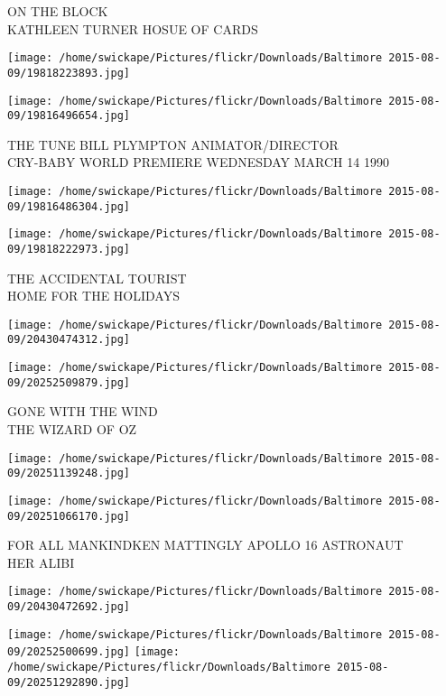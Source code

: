 \documentclass[10pt,letterpaper]{article}
\begin{document}
ON THE BLOCK\\
KATHLEEN TURNER HOSUE OF CARDS\\
\pagebreak

\texttt{[image: /home/swickape/Pictures/flickr/Downloads/Baltimore 2015-08-09/19818223893.jpg]}

\vspace{0.25in}
\texttt{[image: /home/swickape/Pictures/flickr/Downloads/Baltimore 2015-08-09/19816496654.jpg]}

THE TUNE BILL PLYMPTON ANIMATOR/DIRECTOR\\
CRY{-}BABY WORLD PREMIERE WEDNESDAY MARCH 14 1990\\
\pagebreak

\texttt{[image: /home/swickape/Pictures/flickr/Downloads/Baltimore 2015-08-09/19816486304.jpg]}

\vspace{0.25in}
\texttt{[image: /home/swickape/Pictures/flickr/Downloads/Baltimore 2015-08-09/19818222973.jpg]}

THE ACCIDENTAL TOURIST\\
HOME FOR THE HOLIDAYS\\
\pagebreak

\texttt{[image: /home/swickape/Pictures/flickr/Downloads/Baltimore 2015-08-09/20430474312.jpg]}

\vspace{0.25in}
\texttt{[image: /home/swickape/Pictures/flickr/Downloads/Baltimore 2015-08-09/20252509879.jpg]}

GONE WITH THE WIND\\
THE WIZARD OF OZ\\
\pagebreak

\texttt{[image: /home/swickape/Pictures/flickr/Downloads/Baltimore 2015-08-09/20251139248.jpg]}

\vspace{0.25in}
\texttt{[image: /home/swickape/Pictures/flickr/Downloads/Baltimore 2015-08-09/20251066170.jpg]}

FOR ALL MANKINDKEN MATTINGLY APOLLO 16 ASTRONAUT\\
HER ALIBI\\
\pagebreak

\texttt{[image: /home/swickape/Pictures/flickr/Downloads/Baltimore 2015-08-09/20430472692.jpg]}

\vspace{0.25in}
\texttt{[image: /home/swickape/Pictures/flickr/Downloads/Baltimore 2015-08-09/20252500699.jpg]}
\texttt{[image: /home/swickape/Pictures/flickr/Downloads/Baltimore 2015-08-09/20251292890.jpg]}
\end{document}
